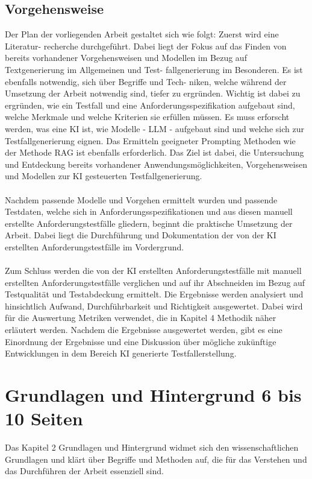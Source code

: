 \documentclass[12pt,toc=bib,toc=listof]{scrreprt}
\begin{document}
\section{Vorgehensweise} %
\label{sec:vorgehensweise}
Der Plan der vorliegenden Arbeit gestaltet sich wie folgt: Zuerst wird eine Literatur-
recherche durchgeführt. Dabei liegt der Fokus auf das Finden von bereits vorhandener
Vorgehensweisen und Modellen im Bezug auf Textgenerierung im Allgemeinen und Test-
fallgenerierung im Besonderen. Es ist ebenfalls notwendig, sich über Begriffe und Tech-
niken, welche während der Umsetzung der Arbeit notwendig sind, tiefer zu ergründen. 
Wichtig ist dabei zu ergründen, wie ein Testfall und eine Anforderungsspezifikation aufgebaut sind, welche Merkmale und welche Kriterien sie erfüllen müssen. Es muss erforscht werden, was eine KI ist, wie Modelle - LLM - aufgebaut sind und welche sich zur Testfallgenerierung eignen. Das Ermitteln geeigneter Prompting Methoden wie der Methode RAG ist ebenfalls erforderlich. Das Ziel ist dabei, die Untersuchung und Entdeckung bereits vorhandener Anwendungsmöglichkeiten, Vorgehensweisen und Modellen zur KI gesteuerten Testfallgenerierung.\\
\\
Nachdem passende Modelle und Vorgehen ermittelt wurden und passende Testdaten, welche sich in Anforderungsspezifikationen und aus diesen manuell erstellte Anforderungstestfälle gliedern, beginnt die praktische Umsetzung der Arbeit. Dabei liegt die Durchführung und Dokumentation der von der KI erstellten Anforderungstestfälle im Vordergrund.\\
\\
Zum Schluss werden die von der KI erstellten Anforderungstestfälle mit manuell erstellten Anforderungstestfälle verglichen und auf ihr Abschneiden im Bezug auf Testqualität und Testabdeckung ermittelt. Die Ergebnisse werden analysiert und hinsichtlich Aufwand, Durchführbarkeit und Richtigkeit ausgewertet. Dabei wird für die Auswertung Metriken verwendet, die in Kapitel 4 Methodik näher erläutert werden. Nachdem die Ergebnisse ausgewertet werden, gibt es eine Einordnung der Ergebnisse und eine Diskussion über mögliche zukünftige Entwicklungen in dem Bereich KI generierte Testfallerstellung.


\chapter{Grundlagen und Hintergrund 6 bis 10 Seiten} %
\label{sec:grundlagen}
Das Kapitel 2 Grundlagen und Hintergrund widmet sich den wissenschaftlichen Grundlagen und klärt über Begriffe und Methoden auf, die für das Verstehen und das Durchführen der Arbeit essenziell sind.\\
\end{document}

